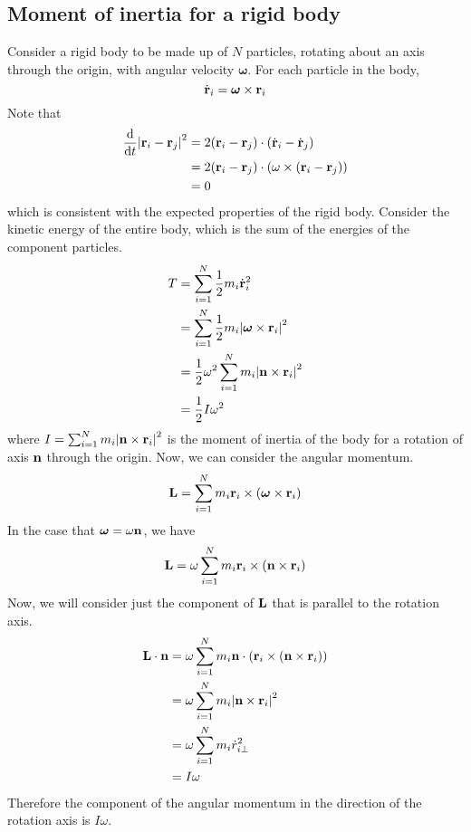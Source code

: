 \subsection{Moment of inertia for a rigid body}
Consider a rigid body to be made up of \(N\) particles, rotating about an axis through the origin, with angular velocity \(\bm \omega\).
For each particle in the body,
\[
	\dot{\vb{r}}_i = \bm \omega \times \vb r_i
\]
Note that
\begin{align*}
	\dv{t} \abs{\vb r_i - \vb r_j}^2 & = 2(\vb r_i - \vb r_j) \cdot (\dot{\vb{r}}_i - \dot{\vb{r}}_j)                 \\
	                                 & = 2(\vb r_i - \vb r_j) \cdot (\omega \times (\vb r_i - \vb r_j)) \\
	                                 & = 0
\end{align*}
which is consistent with the expected properties of the rigid body.
Consider the kinetic energy of the entire body, which is the sum of the energies of the component particles.
\begin{align*}
	T & = \sum_{i=1}^N \frac{1}{2}m_i \dot{\vb r}_i^2                        \\
	  & = \sum_{i=1}^N \frac{1}{2}m_i \abs{\bm\omega \times \vb r_i}^2       \\
	  & = \frac{1}{2} \omega^2 \sum_{i=1}^N m_i \abs{\vb n \times \vb r_i}^2 \\
	  & = \frac{1}{2}I\omega^2
\end{align*}
where \(I = \sum_{i=1}^N m_i \abs{\vb n \times \vb r_i}^2\) is the moment of inertia of the body for a rotation of axis \(\vb n\) through the origin.
Now, we can consider the angular momentum.
\[
	\vb L = \sum_{i=1}^N m_i \vb r_i \times (\bm \omega \times \vb r_i)
\]
In the case that \(\bm\omega = \omega \vb n\), we have
\[
	\vb L = \omega \sum_{i=1}^N m_i \vb r_i \times (\vb n \times \vb r_i)
\]
Now, we will consider just the component of \(\vb L\) that is parallel to the rotation axis.
\begin{align*}
	\vb L \cdot \vb n & = \omega \sum_{i=1}^N m_i \vb n \cdot (\vb r_i \times (\vb n \times \vb r_i)) \\
	                  & = \omega\sum_{i=1}^N m_i \abs{ \vb n \times \vb r_i }^2                       \\
	                  & = \omega\sum_{i=1}^N m_i {\dot r}_{i\perp}^2                                  \\
	                  & = I\omega
\end{align*}
Therefore the component of the angular momentum in the direction of the rotation axis is \(I\omega\).
